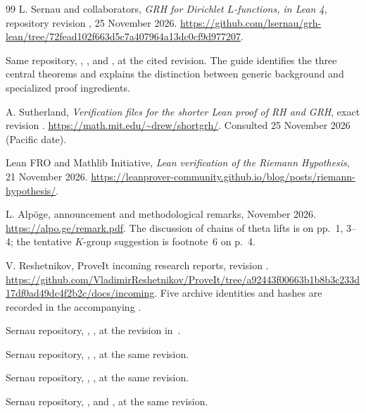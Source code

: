 \documentclass[11pt,letterpaper]{article}
\theoremstyle{remark}
\begin{document}
\begin{thebibliography}{99}
 L. Sernau and collaborators, \emph{GRH for Dirichlet
$L$-functions, in Lean 4}, repository revision
, 25 November 2026.
\url{https://github.com/lsernau/grh-lean/tree/72fead102f663d5c7a407964a13dc0cf9d977207}.

 Same repository, , ,
and , at the cited revision. The guide identifies
the three central theorems and explains the distinction between generic
background and specialized proof ingredients.

 A. Sutherland, \emph{Verification files for the
shorter Lean proof of RH and GRH}, exact revision .
\url{https://math.mit.edu/~drew/shortgrh/}. Consulted 25 November 2026
(Pacific date).

 Lean FRO and Mathlib Initiative, \emph{Lean
verification of the Riemann Hypothesis}, 21 November 2026.
\url{https://leanprover-community.github.io/blog/posts/riemann-hypothesis/}.

 L. Alp\"oge, announcement and methodological remarks,
November 2026. \url{https://alpo.ge/remark.pdf}. The discussion of chains
of theta lifts is on pp.~1, 3--4; the tentative $K$-group suggestion is
footnote~6 on p.~4.

 V. Reshetnikov, ProveIt incoming research reports,
revision .
\url{https://github.com/VladimirReshetnikov/ProveIt/tree/a92443f00663b1b8b3c233d17df0ad49dc4f2b2c/docs/incoming}.
Five archive identities and hashes are recorded in the accompanying
.

 Sernau repository, ,
, at the revision in~\cite{repo}.

 Sernau repository,
,
, at the same revision.

 Sernau repository,
,
, at the same revision.

 Sernau repository,
,
 and
, at the same revision.


\end{thebibliography}
\end{document}
